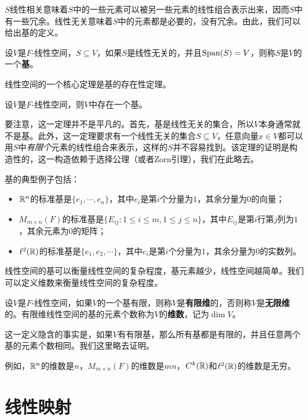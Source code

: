 $S$线性相关意味着$S$中的一些元素可以被另一些元素的线性组合表示出来，因而$S$中有一些冗余。线性无关意味着$S$中的元素都是必要的，没有冗余。由此，我们可以给出基的定义。

\begin{definition}[基]
设$V$是$F$-线性空间，$S\subseteq V$，如果$S$是线性无关的，并且$\operatorname*{Span}(S)=V$，则称$S$是$V$的一个\textbf{基}。
\end{definition}

线性空间的一个核心定理是基的存在性定理。

\begin{theorem}[基的存在性定理]\label{thm:existence-of-basis}
设$V$是$F$-线性空间，则$V$中存在一个基。
\end{theorem}

要注意，这一定理并不是平凡的。首先，基是线性无关的集合，所以$V$本身通常就不是基。此外，这一定理要求有一个线性无关的集合$S\subseteq V$，任意向量$x\in V$都可以用$S$中\emph{有限个}元素的线性组合来表示，这样的$S$并不容易找到。该定理的证明是构造性的，这一构造依赖于选择公理（或者Zorn引理），我们在此略去。

基的典型例子包括：
\begin{itemize}
    \item $\mathbb{R}^n$的标准基是$\{e_1,\cdots,e_n\}$，其中$e_i$是第$i$个分量为$1$，其余分量为$0$的向量；
    \item $M_{m\times n}(F)$的标准基是$\{E_{ij}:1\leq i\leq m,1\leq j\leq n\}$，其中$E_{ij}$是第$i$行第$j$列为$1$，其余元素为$0$的矩阵；
    \item $\ell^2(\mathbb{R})$的标准基是$\{e_1,e_2,\cdots\}$，其中$e_i$是第$i$个分量为$1$，其余分量为$0$的实数列。
\end{itemize}

线性空间的基可以衡量线性空间的复杂程度，基元素越少，线性空间越简单。我们可以定义维数来衡量线性空间的复杂程度。

\begin{definition}[维数]
设$V$是$F$-线性空间，如果$V$的一个基有限，则称$V$是\textbf{有限维}的，否则称$V$是\textbf{无限维}的。有限维线性空间的基的元素个数称为$V$的\textbf{维数}，记为$\dim V$。
\end{definition}
这一定义隐含的事实是，如果$V$有有限基，那么所有基都是有限的，并且任意两个基的元素个数相同。我们这里略去证明。

例如，$\mathbb{R}^n$的维数是$n$，$M_{m\times n}(F)$的维数是$mn$，$C^k(\mathbb{R})$和$\ell^2(\mathbb{R})$的维数是无穷。

\section{线性映射}